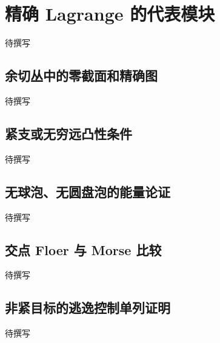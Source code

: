 
% 
% 

\section{精确 Lagrange 的代表模块}
\label{g4:sec:2802}

待撰写

\subsection{余切丛中的零截面和精确图}
\label{g4:subsec:2802:01}
待撰写

\subsection{紧支或无穷远凸性条件}
\label{g4:subsec:2802:02}
待撰写

\subsection{无球泡、无圆盘泡的能量论证}
\label{g4:subsec:2802:03}
待撰写

\subsection{交点 Floer 与 Morse 比较}
\label{g4:subsec:2802:04}
待撰写

\subsection{非紧目标的逃逸控制单列证明}
\label{g4:subsec:2802:05}
待撰写
